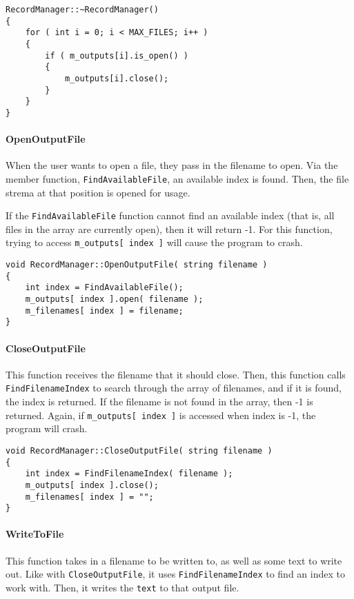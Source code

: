 \documentclass[a4paper,12pt]{book}
\begin{document}
\begin{lstlisting}[style=code]
RecordManager::~RecordManager()
{
    for ( int i = 0; i < MAX_FILES; i++ )
    {
        if ( m_outputs[i].is_open() )
        {
            m_outputs[i].close();
        }
    }
}
\end{lstlisting}

            \paragraph{OpenOutputFile}
            When the user wants to open a file, they pass in the filename
            to open. Via the member function, \texttt{FindAvailableFile},
            an available index is found. Then, the file strema at that
            position is opened for usage.

            If the \texttt{FindAvailableFile} function cannot find
            an available index (that is, all files in the array are
            currently open), then it will return -1. For this function,
            trying to access \texttt{m\_outputs[ index ]} will cause
            the program to crash.
            
\begin{lstlisting}[style=code]
void RecordManager::OpenOutputFile( string filename )
{
    int index = FindAvailableFile();
    m_outputs[ index ].open( filename );
    m_filenames[ index ] = filename;
}
\end{lstlisting}

            \paragraph{CloseOutputFile}
            This function receives the filename that it should close.
            Then, this function calls \texttt{FindFilenameIndex} to
            search through the array of filenames, and if it is found,
            the index is returned. If the filename is not found in the array,
            then -1 is returned. Again, if \texttt{m\_outputs[ index ]}
            is accessed when index is -1, the program will crash.

\newpage
\begin{lstlisting}[style=code]
void RecordManager::CloseOutputFile( string filename )
{
    int index = FindFilenameIndex( filename );
    m_outputs[ index ].close();
    m_filenames[ index ] = "";
}
\end{lstlisting}

            \paragraph{WriteToFile}
            This function takes in a filename to be written to,
            as well as some text to write out. Like with \texttt{CloseOutputFile},
            it uses \texttt{FindFilenameIndex} to find an index to work with.
            Then, it writes the \texttt{text} to that output file.
            
\end{document}
